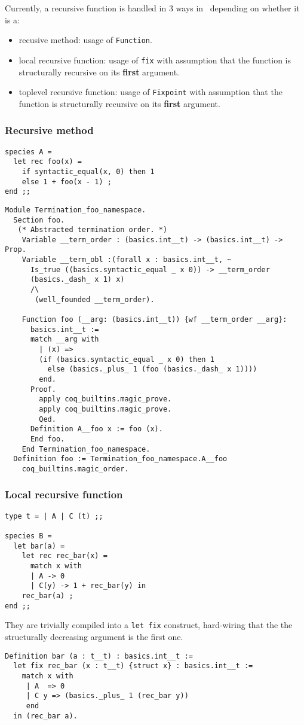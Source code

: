 Currently, a recursive function is handled in 3 ways in \coq\ depending
on whether it is a:
\begin{itemize}
  \item recusive method: usage of {\tt Function}.
  \item local recursive function: usage of {\tt fix} with assumption
  that the function is structurally recursive on its {\bf first} argument.
  \item toplevel recursive function: usage of {\tt Fixpoint} with assumption
  that the function is structurally recursive on its {\bf first} argument.
\end{itemize}

\subsubsection{Recursive method}
{\footnotesize
\begin{lstlisting}
species A =
  let rec foo(x) =
    if syntactic_equal(x, 0) then 1
    else 1 + foo(x - 1) ;
end ;;
\end{lstlisting}
}

{\footnotesize
\begin{lstlisting}[language=MyCoq]
Module Termination_foo_namespace.
  Section foo.
   (* Abstracted termination order. *)
    Variable __term_order : (basics.int__t) -> (basics.int__t) -> Prop.
    Variable __term_obl :(forall x : basics.int__t, ~
      Is_true ((basics.syntactic_equal _ x 0)) -> __term_order
      (basics._dash_ x 1) x)
      /\
       (well_founded __term_order).
      
    Function foo (__arg: (basics.int__t)) {wf __term_order __arg}:
      basics.int__t :=
      match __arg with
        | (x) =>
        (if (basics.syntactic_equal _ x 0) then 1
          else (basics._plus_ 1 (foo (basics._dash_ x 1))))
        end.
      Proof.
        apply coq_builtins.magic_prove.
        apply coq_builtins.magic_prove.
        Qed.
      Definition A__foo x := foo (x).
      End foo.
    End Termination_foo_namespace.
  Definition foo := Termination_foo_namespace.A__foo
    coq_builtins.magic_order.
\end{lstlisting}
}


\subsubsection{Local recursive function}
{\footnotesize
\begin{lstlisting}
type t = | A | C (t) ;;

species B =
  let bar(a) =
    let rec rec_bar(x) =
      match x with
      | A -> 0
      | C(y) -> 1 + rec_bar(y) in
    rec_bar(a) ;
end ;;
\end{lstlisting}
}
They are trivially compiled into a {\tt let fix} construct,
hard-wiring that the the structurally decreasing argument is the first one.
{\footnotesize
\begin{lstlisting}[language=MyCoq]
Definition bar (a : t__t) : basics.int__t :=
  let fix rec_bar (x : t__t) {struct x} : basics.int__t :=
    match x with
     | A  => 0
     | C y => (basics._plus_ 1 (rec_bar y))
     end
  in (rec_bar a).
\end{lstlisting}
}


